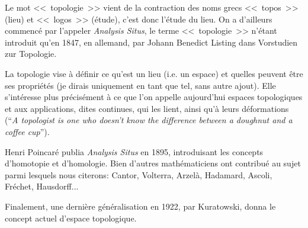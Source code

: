 \begin{histoire}%
Le mot <<~topologie~>> vient de la contraction des noms grecs <<~topos~>> (lieu) et <<~logos~>> (étude),
c'est donc l'étude du lieu. On a d'ailleurs commencé par l'appeler \emph{Analysis Situs}, le terme
<<~topologie~>> n'étant introduit qu'en 1847, en allemand, par Johann Benedict Listing
dans Vorstudien zur Topologie.

La topologie vise à définir ce qu'est un lieu (i.e. un espace) et quelles peuvent être ses propriétés
(je dirais uniquement en tant que tel, sans autre ajout).
Elle s'intéresse plus précisément à ce que l'on appelle aujourd'hui espaces topologiques et aux
applications, dites continues, qui les lient, ainsi qu'à leurs déformations
(``\emph{A topologist is one who doesn't know the difference between a doughnut and a coffee cup}'').

\medskip
{}

Henri Poincaré
 publia \emph{Analysis Situs} en 1895, introduisant les concepts d'homotopie et d'homologie.
Bien d'autres mathématiciens ont contribué au sujet parmi lesquels nous citerons:
Cantor, Volterra, Arzelà, Hadamard, Ascoli, Fréchet, Hausdorff...

%
Finalement, une dernière généralisation en 1922, par Kuratowski, donna le concept actuel d'espace
topologique.
\end{histoire}


